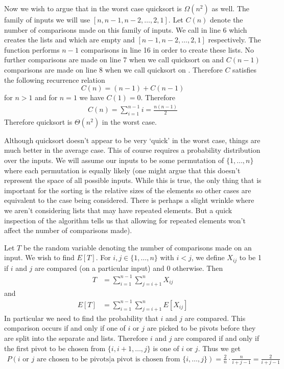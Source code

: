 Now we wish to argue that in the worst case quicksort is $\Omega(n^2)$ as well. The family of inputs we will use $[n, n-1, n-2, \dots, 2, 1]$. Let $C(n)$ denote the number of comparisons made on this family of inputs. We call  in line 6 which creates the lists  and  which are empty and $[n - 1, n - 2, \dots, 2, 1]$ respectively. The function  performs $n - 1$ comparisons in line 16 in order to create these lists. No further comparisons are made on line 7 when we call quicksort on  and $C(n - 1)$ comparisons are made on line 8 when we call quicksort on . Therefore $C$ satisfies the following recurrence relation
$$ C(n) = (n - 1) + C(n - 1) $$
for $n > 1$ and for $n = 1$ we have $C(1) = 0$. Therefore
\begin{align*}
    C(n) = \sum_{i = 1}^{n - 1} i = \frac{n(n - 1)}{2}
\end{align*}
Therefore quicksort is $\Theta(n^2)$ in the worst case.

Although quicksort doesn't appear to be very `quick' in the worst case, things are much better in the average case. This of course requires a probability distribution over the inputs. We will assume our inputs to be some permutation of $\{1, \dots, n\}$ where each permutation is equally likely (one might argue that this doesn't represent the space of all possible inputs. While this is true, the only thing that is important for the sorting is the relative sizes of the elements so other cases are equivalent to the case being considered. There is perhaps a slight wrinkle where we aren't considering lists that may have repeated elements. But a quick inspection of the algorithm tells us that allowing for repeated elements won't affect the number of comparisons made).

Let $T$ be the random variable denoting the number of comparisons made on an input. We wish to find $E[T]$. For $i, j \in \{1, \dots, n\}$ with $i < j$, we define $X_{ij}$ to be 1 if $i$ and $j$ are compared (on a particular input) and 0 otherwise. Then
\begin{align*}
    T &= \sum_{i = 1}^{n - 1} \sum_{j = i + 1}^{n} X_{ij}
\end{align*}
and
\begin{align*}
    E[T] &= \sum_{i = 1}^{n - 1} \sum_{j = i + 1}^{n} E[X_{ij}]
\end{align*}
In particular we need to find the probability that $i$ and $j$ are compared. This comparison occurs if and only if one of $i$ or $j$ are picked to be pivots before they are split into the separate  and  lists. Therefore $i$ and $j$ are compared if and only if the first pivot to be chosen from $\{i, i + 1, \dots, j\}$ is one of $i$ or $j$. Thus we get
\begin{align*}
    P(\text{$i$ or $j$ are chosen to be pivots} \big| \text{a pivot is chosen from } \{i, \dots, j\}) = \frac{2}{n} \cdot \frac{n}{i + j - 1} = \frac{2}{i + j - 1}
\end{align*}

